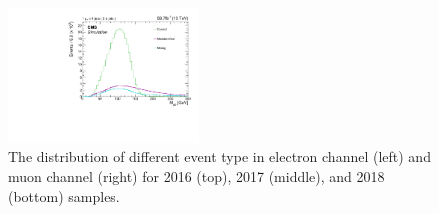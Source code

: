 \begin{figure}[p]
    \includegraphics[width=0.45\textwidth]{figure/bbSep_18_mu_Optimisation_chi2_20_bbSep.pdf}
    \caption[The \Mlb distribution of different event types.]
    {
        The \Mlb distribution of different event type in electron channel (left) and muon channel (right) for 2016 (top), 2017 (middle), and 2018 (bottom) samples.
    }
    \label{fig:opt_lept}
\end{figure}

